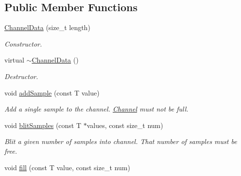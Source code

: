 \subsection*{Public Member Functions}
\begin{DoxyCompactItemize}
\item 
\hypertarget{classgdf_1_1_channel_data_a493aade9101eb8d60a5783c3b37b04fc}{
\hyperlink{classgdf_1_1_channel_data_a493aade9101eb8d60a5783c3b37b04fc}{ChannelData} (size\_\-t length)}
\label{classgdf_1_1_channel_data_a493aade9101eb8d60a5783c3b37b04fc}

\begin{DoxyCompactList}\small\item\em Constructor. \item\end{DoxyCompactList}\item 
\hypertarget{classgdf_1_1_channel_data_a43a64284e5eb513e988514fae70474d6}{
virtual \hyperlink{classgdf_1_1_channel_data_a43a64284e5eb513e988514fae70474d6}{$\sim$ChannelData} ()}
\label{classgdf_1_1_channel_data_a43a64284e5eb513e988514fae70474d6}

\begin{DoxyCompactList}\small\item\em Destructor. \item\end{DoxyCompactList}\item 
\hypertarget{classgdf_1_1_channel_data_a72660b2608d86888a61a51efad28007c}{
void \hyperlink{classgdf_1_1_channel_data_a72660b2608d86888a61a51efad28007c}{addSample} (const T value)}
\label{classgdf_1_1_channel_data_a72660b2608d86888a61a51efad28007c}

\begin{DoxyCompactList}\small\item\em Add a single sample to the channel. \hyperlink{classgdf_1_1_channel}{Channel} must not be full. \item\end{DoxyCompactList}\item 
\hypertarget{classgdf_1_1_channel_data_a5055b2f003e69afd238b064e795adc53}{
void \hyperlink{classgdf_1_1_channel_data_a5055b2f003e69afd238b064e795adc53}{blitSamples} (const T $\ast$values, const size\_\-t num)}
\label{classgdf_1_1_channel_data_a5055b2f003e69afd238b064e795adc53}

\begin{DoxyCompactList}\small\item\em Blit a given number of samples into channel. That number of samples must be free. \item\end{DoxyCompactList}\item 
\hypertarget{classgdf_1_1_channel_data_afebe6672e849f3ca33804e8fb5e73d8c}{
void \hyperlink{classgdf_1_1_channel_data_afebe6672e849f3ca33804e8fb5e73d8c}{fill} (const T value, const size\_\-t num)}
\label{classgdf_1_1_channel_data_afebe6672e849f3ca33804e8fb5e73d8c}


\end{DoxyCompactItemize}
